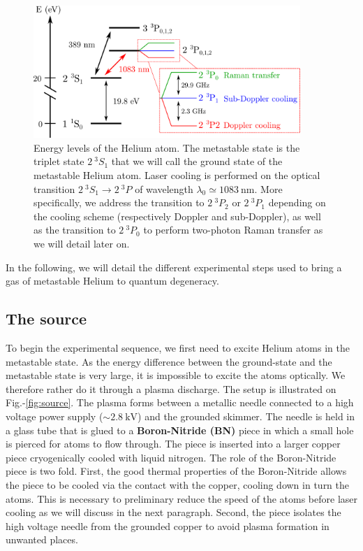 \begin{figure}
    \centering
    \includegraphics[width=0.9\textwidth]{Fig/Chapter3/niveaux.png}
    \caption[Energy levels of the Helium atom]{Energy levels of the Helium atom. The metastable state is the triplet state $2 \ ^3S_1$ that we will call the ground state of the metastable Helium atom. Laser cooling is performed on the optical transition $2 \ ^3S_1 \rightarrow 2 \ ^3 P$ of wavelength $\lambda_0 \simeq 1083 \ \mathrm{nm}$. More specifically, we address the transition to  $2 \ ^3 P_2$ or $2 \ ^3 P_1$ depending on the cooling scheme (respectively Doppler and sub-Doppler), as well as the transition to  $2 \ ^3 P_0$ to perform two-photon Raman transfer as we will detail later on.}
    \label{fig:niveaux}
\end{figure}

In the following, we will detail the different experimental steps used to bring a gas of metastable Helium to quantum degeneracy.


\subsection{The source}

To begin the experimental sequence, we first need to excite Helium atoms in the metastable state. As the energy difference between the ground-state and the metastable state is very large, it is impossible to excite the atoms optically. We therefore rather do it through a plasma discharge. The setup is illustrated on Fig.-\ref{fig:source}. The plasma forms between a metallic needle connected to a high voltage power supply ($\sim 2.8 \ \mathrm{kV}$) and the grounded skimmer. The needle is held in a glass tube that is glued to a \textbf{Boron-Nitride (BN)} piece in which a small hole is pierced for atoms to flow through. The piece is inserted into a larger copper piece cryogenically cooled with liquid nitrogen. The role of the Boron-Nitride piece is two fold. First, the good thermal properties of the Boron-Nitride allows the piece to be cooled via the contact with the copper, cooling down in turn the atoms. This is necessary to preliminary reduce the speed of the atoms before laser cooling as we will discuss in the next paragraph. Second, the piece isolates the high voltage needle from the grounded copper to avoid plasma formation in unwanted places.

